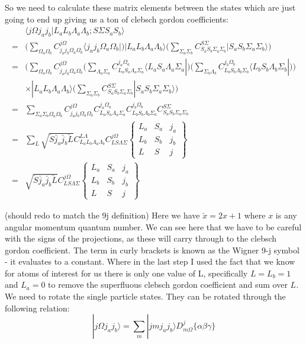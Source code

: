 \documentclass[prl, longbibliography]{revtex4-2}
\begin{document}
So we need to calculate these matrix elements between the states which are just going to end up giving us a ton of clebsch gordon coefficients: 
\begin{align}
&\langle j\Omega j_a j_b | L_a L_b \Lambda_a \Lambda_b; S\Sigma S_a S_b\rangle \\
= &\Bigg(\sum_{\Omega_a \Omega_b} C_{j_a j_b \Omega_a \Omega_b}^{j \Omega} \langle j_a j_b \Omega_a \Omega_b |\Bigg)|L_a L_b \Lambda_a \Lambda_b\rangle \Bigg(\sum_{\Sigma_a\Sigma_b} C_{S_a S_b \Sigma_a \Sigma_b}^{S \Sigma}| S_a S_b \Sigma_a \Sigma_b\rangle\Bigg)\\
=&\Bigg(\sum_{\Omega_a \Omega_b}C_{j_a j_b \Omega_a \Omega_b}^{j \Omega}\Big(\sum_{\Lambda_a\Sigma_a} C_{L_a S_a \Lambda_a \Sigma_a}^{j_a \Omega_a}\langle L_a S_a \Lambda_a \Sigma_a |\Big)\Big(\sum_{\Sigma_b\Lambda_b} C_{L_b S_b \Lambda_b \Sigma_b}^{j_b \Omega_b}\langle L_b S_b \Lambda_b \Sigma_b |\Big)\Bigg)\\
&\times|L_a L_b \Lambda_a \Lambda_b\rangle\Bigg(\sum_{\Sigma_a\Sigma_b} C_{S_a S_b \Sigma_a \Sigma_b}^{S \Sigma} | S_a S_b \Sigma_a \Sigma_b\rangle\Bigg)\\
=&\sum_{\Sigma_a \Sigma_b \Omega_a \Omega_b} 
C_{j_a j_b \Omega_a \Omega_b}^{j \Omega} 
C_{L_a S_a \Lambda_a \Sigma_a}^{j_a \Omega_a}
C_{L_b S_b \Lambda_b \Sigma_b}^{j_b \Omega_b} 
C_{S_a S_b \Sigma_a \Sigma_b}^{S \Sigma}\\
=&\sum_{L} \sqrt{\breve{S}\breve{j_a}\breve{j_b}\breve{L}} 
C_{L_a L_b \Lambda_a \Lambda_b}^{L \Lambda}
C_{L S \Lambda \Sigma}^{j \Omega}
\begin{Bmatrix}
L_a & S_a & j_a\\
L_b & S_b & j_b\\
L & S & j
\end{Bmatrix}\\
=&\sqrt{\breve{S}\breve{j_a}\breve{j_b}\breve{L}} 
C_{L S \Lambda \Sigma}^{j \Omega}
\begin{Bmatrix}
L_a & S_a & j_a\\
L_b & S_b & j_b\\
L & S & j
\end{Bmatrix}
\end{align}

(should redo to match the 9j definition) Here we have $\breve{x}=2x+1$ where $x$ is any angular momentum quantum number. We can see here that we have to be careful with the signs of the projections, as these will carry through to the clebsch gordon coefficient.  The term in curly brackets is known as the Wigner 9-j symbol - it evaluates to a constant. Where in the last step I used the fact that we know for atoms of interest for us there is only one value of L, specifically $L=L_b=1$ and $L_a=0$ to remove the superfluous clebsch gordon coefficient and sum over $L$. We need to rotate the single particle states. They can be rotated through the following relation:
\begin{equation}
|j\Omega j_a j_b\rangle = \sum_m |j m j_a j_b\rangle D^j_{m \Omega}\{\alpha\beta\gamma\}
\end{equation}
\end{document}
